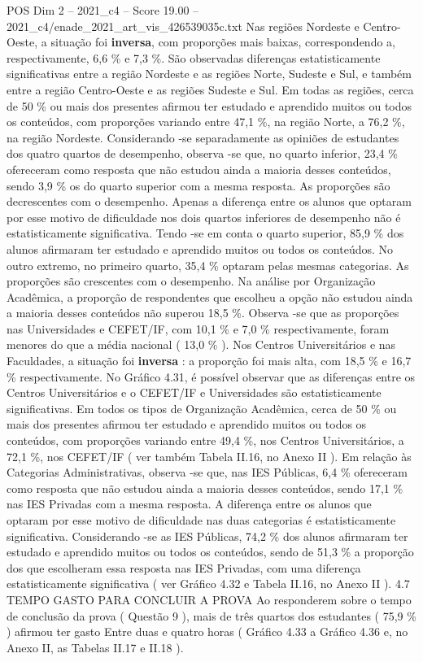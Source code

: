 \begin{textsample}{POS Dim 2 – 2021\_c4 – Score 19.00 – 2021\_c4/enade\_2021\_art\_vis\_426539035c.txt}
Nas regiões Nordeste e Centro-Oeste, a situação foi \textbf{inversa}, com proporções mais baixas, correspondendo a, respectivamente, 6,6 \% e 7,3 \%.
São observadas diferenças estatisticamente significativas entre a região Nordeste e as regiões Norte, Sudeste e Sul, e também entre a região Centro-Oeste e as regiões Sudeste e Sul.
Em todas as regiões, cerca de 50 \% ou mais dos presentes afirmou ter estudado e aprendido muitos ou todos os conteúdos, com proporções variando entre 47,1 \%, na região Norte, a 76,2 \%, na região Nordeste.
Considerando -se separadamente as opiniões de estudantes dos quatro quartos de desempenho, observa -se que, no quarto inferior, 23,4 \% ofereceram como resposta que não estudou ainda a maioria desses conteúdos, sendo 3,9 \% os do quarto superior com a mesma resposta.
As proporções são decrescentes com o desempenho.
Apenas a diferença entre os alunos que optaram por esse motivo de dificuldade nos dois quartos inferiores de desempenho não é estatisticamente significativa.
Tendo -se em conta o quarto superior, 85,9 \% dos alunos afirmaram ter estudado e aprendido muitos ou todos os conteúdos.
No outro extremo, no primeiro quarto, 35,4 \% optaram pelas mesmas categorias.
As proporções são crescentes com o desempenho.
Na análise por Organização Acadêmica, a proporção de respondentes que escolheu a opção não estudou ainda a maioria desses conteúdos não superou 18,5 \%.
Observa -se que as proporções nas Universidades e CEFET/IF, com 10,1 \% e 7,0 \% respectivamente, foram menores do que a média nacional ( 13,0 \% ).
Nos Centros Universitários e nas Faculdades, a situação foi \textbf{inversa} : a proporção foi mais alta, com 18,5 \% e 16,7 \% respectivamente.
No Gráfico 4.31, é possível observar que as diferenças entre os Centros Universitários e o CEFET/IF e Universidades são estatisticamente significativas.
Em todos os tipos de Organização Acadêmica, cerca de 50 \% ou mais dos presentes afirmou ter estudado e aprendido muitos ou todos os conteúdos, com proporções variando entre 49,4 \%, nos Centros Universitários, a 72,1 \%, nos CEFET/IF ( ver também Tabela II.16, no Anexo II ).
Em relação às Categorias Administrativas, observa -se que, nas IES Públicas, 6,4 \% ofereceram como resposta que não estudou ainda a maioria desses conteúdos, sendo 17,1 \% nas IES Privadas com a mesma resposta.
A diferença entre os alunos que optaram por esse motivo de dificuldade nas duas categorias é estatisticamente significativa.
Considerando -se as IES Públicas, 74,2 \% dos alunos afirmaram ter estudado e aprendido muitos ou todos os conteúdos, sendo de 51,3 \% a proporção dos que escolheram essa resposta nas IES Privadas, com uma diferença estatisticamente significativa ( ver Gráfico 4.32 e Tabela II.16, no Anexo II ). 4.7 TEMPO GASTO PARA CONCLUIR A PROVA Ao responderem sobre o tempo de conclusão da prova ( Questão 9 ), mais de três quartos dos estudantes ( 75,9 \% ) afirmou ter gasto Entre duas e quatro horas ( Gráfico 4.33 a Gráfico 4.36 e, no Anexo II, as Tabelas II.17 e II.18 ).

\end{textsample}
